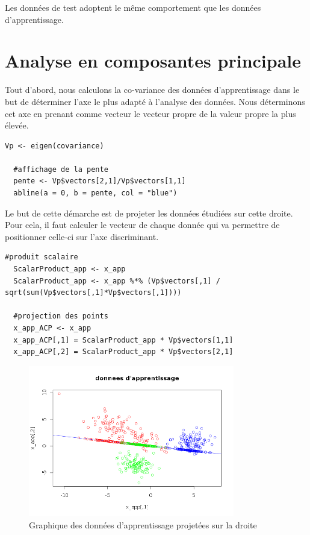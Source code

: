 \documentclass[a4paper,11pt]{article}
\begin{document}
  Les données de test adoptent le même comportement que les données d'apprentissage.
  
  \section{Analyse en composantes principale}
  
  Tout d'abord, nous calculons la co-variance des données d'apprentissage dans le but de déterminer
  l'axe le plus adapté à l'analyse des données. Nous déterminons cet axe en prenant comme vecteur
  le vecteur propre de la valeur propre la plus élevée.\\
  
  \begin{lstlisting}[caption=Calcul de l'axe discriminant]
  Vp <- eigen(covariance)

  #affichage de la pente
  pente <- Vp$vectors[2,1]/Vp$vectors[1,1]
  abline(a = 0, b = pente, col = "blue")
  \end{lstlisting}

  Le but de cette démarche est de projeter les données étudiées sur cette droite. Pour cela, il
  faut calculer le vecteur de chaque donnée qui va permettre de positionner celle-ci sur l'axe 
  discriminant.\\
  
  \begin{lstlisting}[caption=Projection des données d'apprentissage sur l'axe discriminant]
  #produit scalaire
  ScalarProduct_app <- x_app
  ScalarProduct_app <- x_app %*% (Vp$vectors[,1] / sqrt(sum(Vp$vectors[,1]*Vp$vectors[,1])))

  #projection des points
  x_app_ACP <- x_app
  x_app_ACP[,1] = ScalarProduct_app * Vp$vectors[1,1]
  x_app_ACP[,2] = ScalarProduct_app * Vp$vectors[2,1]
  \end{lstlisting}
  
  \begin{figure}[H]
  \center
   \includegraphics[width=9cm]{apprentissage_acp.png}
   \caption{Graphique des données d'apprentissage projetées sur la droite}
  \end{figure}
  
\end{document}
